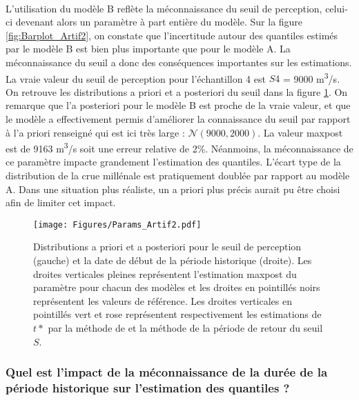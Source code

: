 \documentclass[11pt]{article}
\begin{document}
	\paragraph{} L'utilisation du modèle B reflète la méconnaissance du seuil de perception, celui-ci devenant alors un paramètre à part entière du modèle. Sur la figure \ref{fig:Barplot_Artif2}, on constate que l'incertitude autour des quantiles estimés par le modèle B est bien plus importante que pour le modèle A. La méconnaissance du seuil a donc des conséquences importantes sur les estimations. La vraie valeur du seuil de perception pour l'échantillon 4 est $S4$ = 9000 m\textsuperscript{3}/s. On retrouve les distributions a priori et a posteriori du seuil dans la figure \ref{fig:Params_Artif2}. On remarque que l'a posteriori pour le modèle B est proche de la vraie valeur, et que le modèle a effectivement permis d'améliorer la connaissance du seuil par rapport à l'a priori renseigné qui est ici très large : $\mathcal{N}(9000,2000)$. La valeur maxpost est de 9163 m\textsuperscript{3}/s soit une erreur relative de 2\%. Néanmoins, la méconnaissance de ce paramètre impacte grandement l'estimation des quantiles. L'écart type de la distribution de la crue millénale est pratiquement doublée par rapport au modèle A. Dans une situation plus réaliste, un a priori plus précis aurait pu être choisi afin de limiter cet impact. 
	
	 \begin{figure}[h]
		\centering
		\texttt{[image: Figures/Params\_Artif2.pdf]}	
		\caption{Distributions a priori et a posteriori pour le seuil de perception (gauche) et la date de début de la période historique (droite). Les droites verticales pleines représentent l'estimation maxpost du paramètre pour chacun des modèles et les droites en pointillés noirs représentent les valeurs de référence. Les droites verticales en pointillés vert et rose représentent respectivement les estimations de $t*$ par la méthode de \cite{prosdocimi_german_2018} et la méthode de la période de retour du seuil $S$.}
		\label{fig:Params_Artif2}
	\end{figure}
	
	\subsubsection{Quel est l'impact de la méconnaissance de la durée de la période historique sur l'estimation des quantiles ?}	
	
\end{document}
